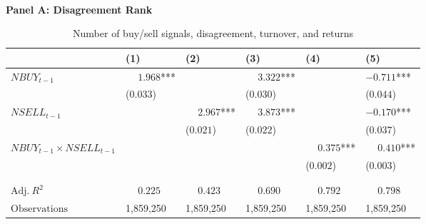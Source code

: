 
\begin{table}



\caption[NBUY/NSELL, Disagreement, Turnover, and Returns]{\label{tab:nbuy_nsell_sorts_reg}Number of buy/sell signals, disagreement, turnover, and returns}
\centering
\fontsize{9}{11}\selectfont
\begin{threeparttable}
\phantom{ }\\
\textbf{Panel A: Disagreement Rank}
\begin{tabular}[t]{>{\raggedright\arraybackslash}p{4.4cm}>{\raggedright\arraybackslash}p{1.6cm}>{\raggedright\arraybackslash}p{1.6cm}>{\raggedright\arraybackslash}p{1.6cm}>{\raggedright\arraybackslash}p{1.6cm}>{\raggedright\arraybackslash}p{1.6cm}}
\toprule
 & \phantom{-}(1) & \phantom{-}(2) & \phantom{-}(3) & \phantom{-}(4) & \phantom{-}(5)\\
\midrule
$NBUY_{t-1}$ & $\phantom{-}1.968$*** &  & $\phantom{-}3.322$*** &  & $-0.711$***\\
 & (\phantom{-}$0.033$) &  & (\phantom{-}$0.030$) &  & (\phantom{-}$0.044$)\\
\addlinespace
$NSELL_{t-1}$ &  & $\phantom{-}2.967$*** & $\phantom{-}3.873$*** &  & $-0.170$***\\
 &  & (\phantom{-}$0.021$) & (\phantom{-}$0.022$) &  & (\phantom{-}$0.037$)\\
\addlinespace
$NBUY_{t-1} \times NSELL_{t-1}$ &  &  &  & $\phantom{-}0.375$*** & $\phantom{-}0.410$***\\
 &  &  &  & (\phantom{-}$0.002$) & (\phantom{-}$0.003$)\\
 &  &  &  &  \vphantom{1} & \\
\midrule
 &  &  &  &  & \\
$\textrm{Adj.} \: R^2$ & {$\phantom{-}0.225$} & {$\phantom{-}0.423$} & {$\phantom{-}0.690$} & {$\phantom{-}0.792$} & {$\phantom{-}0.798$}\\
$\textrm{Observations}$ & {\phantom{-}1,859,250} & {\phantom{-}1,859,250} & {\phantom{-}1,859,250} & {\phantom{-}1,859,250} & {\phantom{-}1,859,250}\\
\bottomrule
\end{tabular}
\begin{tablenotes}
\item 
\end{tablenotes}
\end{threeparttable}



\centering\fontsize{9}{11}\selectfont


\end{table}
